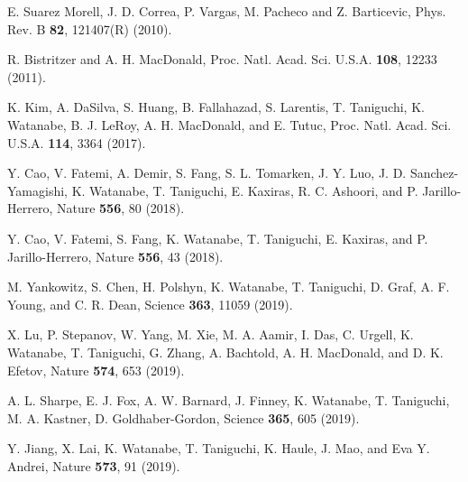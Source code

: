 \documentclass[aps,prl,reprint,amssymb,groupedaddress,twocolumn]{revtex4}
\begin{document}
\begin{thebibliography}{99}
	E. Suarez Morell, J. D. Correa, P. Vargas, M. Pacheco and Z. Barticevic,  
	Phys. Rev. B \textbf{82}, 121407(R) (2010).
	
	R. Bistritzer and A. H. MacDonald,
	Proc. Natl. Acad. Sci. U.S.A. \textbf{108}, 12233 (2011).
	
	K. Kim, A. DaSilva, S. Huang, B. Fallahazad, S. Larentis, T. Taniguchi, K. Watanabe, B. J. LeRoy, A. H. MacDonald, and  E. Tutuc,
	Proc. Natl. Acad. Sci. U.S.A. \textbf{114}, 3364 (2017).
	
	Y. Cao, V. Fatemi, A. Demir, S. Fang, S. L. Tomarken, J. Y. Luo, 
	J. D. Sanchez-Yamagishi, K. Watanabe, T. Taniguchi, E. Kaxiras, R. C. Ashoori, and  P. Jarillo-Herrero, 
	Nature \textbf{556}, 80 (2018).
	
	Y. Cao, V. Fatemi, S. Fang, K. Watanabe,
	T. Taniguchi, E. Kaxiras, and  P. Jarillo-Herrero, 
	Nature \textbf{556}, 43 (2018).
	
	M. Yankowitz, S. Chen, H. Polshyn, K. Watanabe, T. Taniguchi, D. Graf, A. F. Young, and C. R. Dean, 
	Science \textbf{363}, 11059 (2019).
	
	X. Lu, P. Stepanov, W. Yang, M. Xie, M. A. Aamir, I. Das, C. Urgell, K. Watanabe, T. Taniguchi, G. Zhang, A. Bachtold, A. H. MacDonald, and D. K. Efetov,
	Nature \textbf{574}, 653 (2019).
	
	A. L. Sharpe, E. J. Fox, A. W. Barnard, J. Finney, K. Watanabe, T. Taniguchi, M. A. Kastner, D. Goldhaber-Gordon,
	Science \textbf{365}, 605 (2019).
	
	Y. Jiang, X. Lai, K. Watanabe, T. Taniguchi, K. Haule, J. Mao, and Eva Y. Andrei,
	Nature \textbf{573}, 91 (2019).
	

\end{thebibliography}
\end{document}
